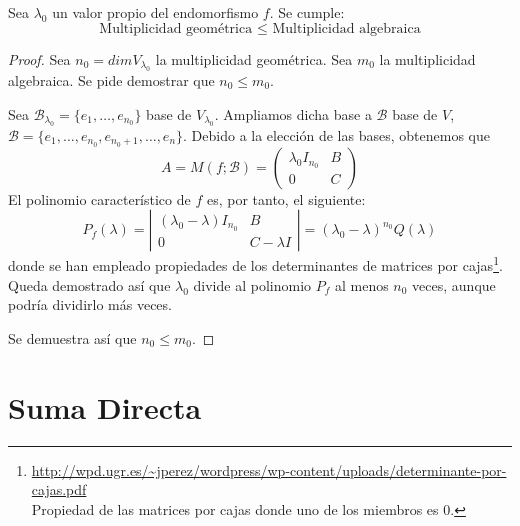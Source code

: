 \begin{lema}
    Sea $\lambda_0$ un valor propio del endomorfismo $f$. Se cumple:
    \begin{equation*}
        \text{Multiplicidad geométrica } \leq \text{ Multiplicidad algebraica}
    \end{equation*}
\end{lema}
\begin{proof}
    Sea $n_0 = dimV_{\lambda_0}$ la multiplicidad geométrica. Sea $m_0$ la multiplicidad algebraica. Se pide demostrar que $n_0 \leq m_0$.
    
    Sea $\mathcal{B}_{\lambda_0} = \{e_1, \dots, e_{n_0}\}$ base de $V_{\lambda_0}$. Ampliamos dicha base a $\mathcal{B}$ base de $V$, $\mathcal{B}=\{e_1, \dots, e_{n_0}, e_{n_0+1}, \dots, e_n\}$. Debido a la elección de las bases, obtenemos que
    \begin{equation*}
        A = M(f;\mathcal{B}) = \left( \begin{array}{c|c}
            \lambda_0 I_{n_0} & B \\ \hline
            0 & C
        \end{array} \right)
    \end{equation*}
    El polinomio característico de $f$ es, por tanto, el siguiente:
    \begin{equation*}
        P_f(\lambda) = \left| \begin{array}{c|c}
            (\lambda_0-\lambda) I_{n_0} & B \\ \hline
            0 & C - \lambda I
        \end{array} \right| = (\lambda_0 - \lambda)^{n_0} Q(\lambda)
    \end{equation*}
    donde se han empleado propiedades de los determinantes de matrices por cajas\footnote{\url{http://wpd.ugr.es/~jperez/wordpress/wp-content/uploads/determinante-por-cajas.pdf}\\Propiedad de las matrices por cajas donde uno de los miembros es $0$.}. Queda demostrado así que $\lambda_0$ divide al polinomio $P_f$ al menos $n_0$ veces, aunque podría dividirlo más veces.
    
    Se demuestra así que $n_0 \leq m_0$.
\end{proof}

\section{Suma Directa}

